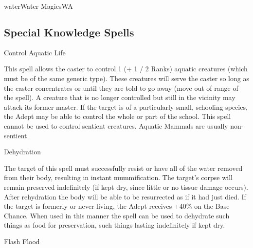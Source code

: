 \begin{college}[1.3]{water}{Water Magics}{WA}
\subsection{Special Knowledge Spells}

\begin{spell}[S-1]{Control Aquatic Life}

\begin{effects}
This spell allows the caster to control 1 (+ 1 / 2 Ranks) aquatic
creatures (which must be of the same generic type). These creatures
will serve the caster so long as the caster concentrates or until they
are told to go away (move out of range of the spell). A creature that
is no longer controlled but still in the vicinity may attack its
former master. If the target is of a particularly small, schooling
species, the Adept may be able to control the whole or part of the
school. This spell cannot be used to control sentient
creatures. Aquatic Mammals are usually non-sentient.
\end{effects}
\end{spell}

\begin{spell}[S-2]{Dehydration}

\begin{effects}
The target of this spell must successfully resist or have all of the
water removed from their body, resulting in instant mummification. The
target's corpse will remain preserved indefinitely (if kept dry, since
little or no tissue damage occurs). After rehydration the body will be
able to be resurrected as if it had just died. If the target is
formerly or never living, the Adept receives +40\% on the Base
Chance. When used in this manner the spell can be used to dehydrate
such things as food for preservation, such things lasting indefinitely
if kept dry.
\end{effects}
\end{spell}

\begin{spell}[S-3]{Flash Flood}


\end{spell}
\end{college}
